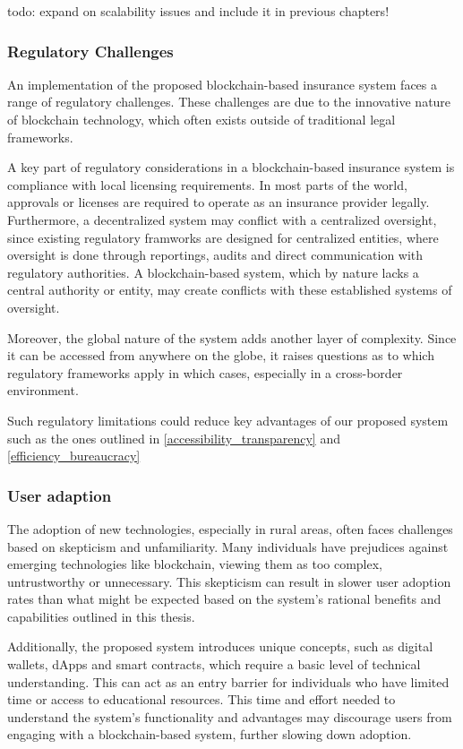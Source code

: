 todo: expand on scalability issues and include it in previous chapters!

\subsubsection{Regulatory Challenges}
An implementation of the proposed blockchain-based insurance system faces a range of regulatory challenges. These challenges are due to the innovative nature of blockchain technology, which often exists outside of traditional legal frameworks.

A key part of regulatory considerations in a blockchain-based insurance system is compliance with local licensing requirements. In most parts of the world, approvals or licenses are required to operate as an insurance provider legally. Furthermore, a decentralized system may conflict with a centralized oversight, since existing regulatory framworks are designed for centralized entities, where oversight is done through reportings, audits and direct communication with regulatory authorities. A blockchain-based system, which by nature lacks a central authority or entity, may create conflicts with these established systems of oversight.

Moreover, the global nature of the system adds another layer of complexity. Since it can be accessed from anywhere on the globe, it raises questions as to which regulatory frameworks apply in which cases, especially in a cross-border environment.

Such regulatory limitations could reduce key advantages of our proposed system such as the ones outlined in \cref{accessibility_transparency} and \cref{efficiency_bureaucracy}

\subsubsection{User adaption}
The adoption of new technologies, especially in rural areas, often faces challenges based on skepticism and unfamiliarity. Many individuals have prejudices against emerging technologies like blockchain, viewing them as too complex, untrustworthy or unnecessary. This skepticism can result in slower user adoption rates than what might be expected based on the system's rational benefits and capabilities outlined in this thesis.

Additionally, the proposed system introduces unique concepts, such as digital wallets, dApps and smart contracts, which require a basic level of technical understanding. This can act as an entry barrier for individuals who have limited time or access to educational resources. This time and effort needed to understand the system's functionality and advantages may discourage users from engaging with a blockchain-based system, further slowing down adoption.

